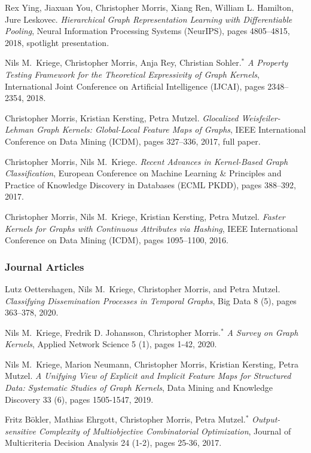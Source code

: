 \documentclass[11pt, a4paper, DIV=12]{scrartcl}
\begin{document}
\begin{thebibliography}{5}
	Rex Ying, Jiaxuan You, Christopher Morris, Xiang Ren, William L. Hamilton, Jure Leskovec.
	\emph{Hierarchical Graph Representation Learning with Differentiable Pooling},
	Neural Information Processing Systems (NeurIPS), pages 4805--4815, 2018, spotlight presentation.
	
	Nils M.~Kriege, Christopher Morris, Anja Rey, Christian Sohler.$^*$
	\emph{A Property Testing Framework for the Theoretical Expressivity of Graph Kernels},
	International Joint Conference on Artificial Intelligence (IJCAI), pages 2348--2354, 2018.
	
    Christopher Morris, Kristian Kersting, Petra Mutzel.
	\emph{Glocalized Weisfeiler-Lehman Graph Kernels: Global-Local Feature Maps of Graphs},
	IEEE International Conference on Data Mining (ICDM), pages 327--336, 2017, full paper.
	
	Christopher Morris, Nils M.~Kriege.
	\emph{Recent Advances in Kernel-Based Graph Classification},
	European Conference on Machine Learning \& Principles and Practice of Knowledge Discovery in Databases (ECML PKDD), pages 388--392, 2017.
	
    Christopher Morris, Nils M.~Kriege, Kristian Kersting, Petra Mutzel.
	\emph{Faster Kernels for Graphs with Continuous Attributes via Hashing},
	IEEE International Conference on Data Mining (ICDM), pages 1095--1100, 2016.
\subsubsection*{Journal Articles}

Lutz Oettershagen, Nils M.~Kriege, Christopher Morris, and Petra Mutzel.
\emph{Classifying Dissemination Processes in Temporal Graphs},
Big Data 8 (5), pages 363--378, 2020.

Nils M.~Kriege,  Fredrik D. Johansson, Christopher Morris.$^*$
\emph{A Survey on Graph Kernels},
Applied Network Science 5 (1), pages 1-42, 2020.

Nils M.~Kriege,  Marion Neumann, Christopher Morris, Kristian Kersting, Petra Mutzel.
\emph{A Unifying View of Explicit and Implicit Feature Maps for Structured Data: Systematic Studies of Graph Kernels},
Data Mining and Knowledge Discovery 33 (6), pages 1505-1547, 2019.

Fritz B\"okler, Mathias Ehrgott, Christopher Morris, Petra Mutzel.$^*$
\emph{Output-sensitive Complexity of Multiobjective Combinatorial Optimization},
Journal of Multicriteria Decision Analysis 24 (1-2), pages 25-36, 2017.


\end{thebibliography}
\end{document}
